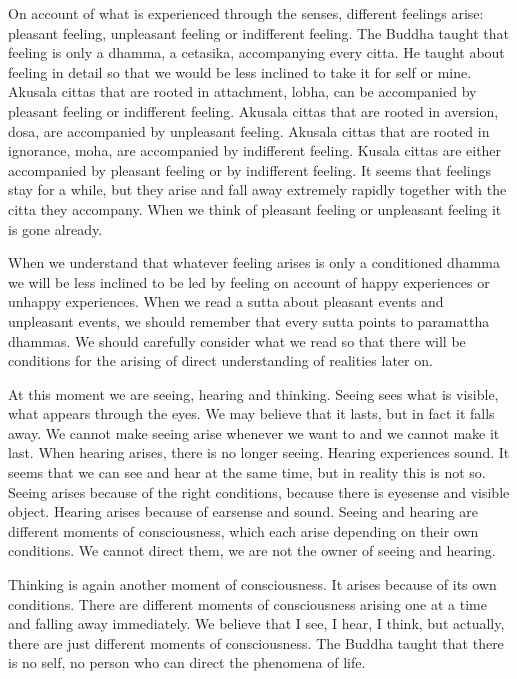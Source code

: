 {{{{{{{{{{On account of what is experienced
through the senses, different feelings arise: pleasant feeling,
unpleasant feeling or indifferent feeling. The Buddha taught that
feeling is only a dhamma, a cetasika, accompanying every citta. He
taught about feeling in detail so that we would be less inclined to take
it for self or mine. Akusala cittas that are rooted in attachment,
lobha, can be accompanied by pleasant feeling or indifferent feeling.
Akusala cittas that are rooted in aversion, dosa, are accompanied by
unpleasant feeling. Akusala cittas that are rooted in ignorance, moha,
are accompanied by indifferent feeling. Kusala cittas are either
accompanied by pleasant feeling or by indifferent feeling. It seems that
feelings stay for a while, but they arise and fall away extremely
rapidly together with the citta they accompany. When we think of
pleasant feeling or unpleasant feeling it is gone already.

When we understand that whatever
feeling arises is only a conditioned dhamma we will be less inclined to
be led by feeling on account of happy experiences or unhappy
experiences. When we read a sutta about pleasant events and unpleasant
events, we should remember that every sutta points to paramattha
dhammas. We should carefully consider what we read so that there will be
conditions for the arising of direct understanding of realities later
on. 

At this moment we are seeing, hearing
and thinking. Seeing sees what is visible, what appears through the
eyes. We may believe that it lasts, but in fact it falls away. We cannot
make seeing arise whenever we want to and we cannot make it last. When
hearing arises, there is no longer seeing. Hearing experiences sound. It
seems that we can see and hear at the same time, but in reality this is
not so. Seeing arises because of the right conditions, because there is
eyesense and visible object. Hearing arises because of earsense and
sound. Seeing and hearing are different moments of consciousness, which
each arise depending on their own conditions. We cannot direct them, we
are not the owner of seeing and hearing.~

Thinking is again another moment of
consciousness. It arises because of its own conditions. There are
different moments of consciousness arising one at a time and falling
away immediately. We believe that I see, I hear, I think, but actually,
there are just different moments of consciousness. The Buddha taught
that there is no self, no person who can direct the phenomena of life.

}}}}}}}}}}
